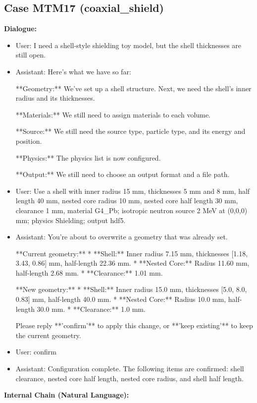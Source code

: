 \documentclass[11pt]{ctexart}
\begin{document}
\subsection{Case MTM17 (coaxial\_shield)}
\textbf{Dialogue:}
\begin{itemize}
\item User: I need a shell-style shielding toy model, but the shell thicknesses are still open.
\item Assistant: Here's what we have so far:

**Geometry:** We've set up a shell structure. Next, we need the shell's inner radius and its thicknesses.

**Materials:** We still need to assign materials to each volume.

**Source:** We still need the source type, particle type, and its energy and position.

**Physics:** The physics list is now configured.

**Output:** We still need to choose an output format and a file path.
\item User: Use a shell with inner radius 15 mm, thicknesses 5 mm and 8 mm, half length 40 mm, nested core radius 10 mm, nested core half length 30 mm, clearance 1 mm, material G4\_Pb; isotropic neutron source 2 MeV at (0,0,0) mm; physics Shielding; output hdf5.
\item Assistant: You're about to overwrite a geometry that was already set.

**Current geometry:**
*   **Shell:** Inner radius 7.15 mm, thicknesses [1.18, 3.43, 0.86] mm, half-length 22.36 mm.
*   **Nested Core:** Radius 11.60 mm, half-length 2.68 mm.
*   **Clearance:** 1.01 mm.

**New geometry:**
*   **Shell:** Inner radius 15.0 mm, thicknesses [5.0, 8.0, 0.83] mm, half-length 40.0 mm.
*   **Nested Core:** Radius 10.0 mm, half-length 30.0 mm.
*   **Clearance:** 1.0 mm.

Please reply **'confirm'** to apply this change, or **'keep existing'** to keep the current geometry.
\item User: confirm
\item Assistant: Configuration complete. The following items are confirmed: shell clearance, nested core half length, nested core radius, and shell half length.
\end{itemize}
\textbf{Internal Chain (Natural Language):}
\end{document}
